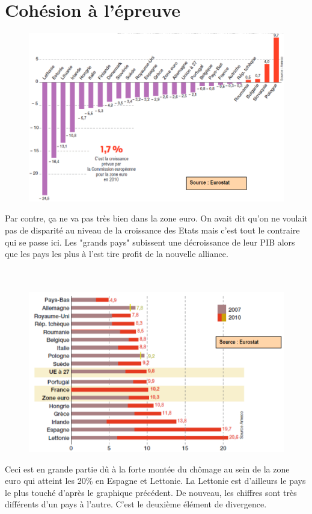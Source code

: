 \section{Cohésion à l'épreuve}

\begin{figure}
\includegraphics[scale=0.3]{30}
\end{figure}
\noindent Par contre, ça ne va pas très bien dans la zone euro. On avait dit qu'on ne voulait pas de disparité au niveau de la croissance des Etats mais c'est tout le contraire qui se passe ici. Les "grands pays" subissent une décroissance de leur PIB alors que les pays les plus à l'est tire profit de la nouvelle alliance. \\\\\\

\begin{figure}
\includegraphics[scale=0.3]{31}
\end{figure}
\noindent Ceci est en grande partie dû à la forte montée du chômage au sein de la zone euro qui atteint les 20\% en Espagne et Lettonie. La Lettonie est d'ailleurs le pays le plus touché d'après le graphique précédent. De nouveau, les chiffres sont très différents d'un pays à l'autre. C'est le deuxième élément de divergence. \\\\\\

